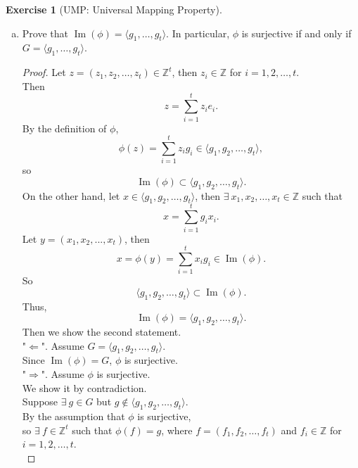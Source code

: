 \documentclass{amsart}
\newcommand{\bbz}{\mathbb{Z}}
\newcommand{\im}{\operatorname{Im}}
\theoremstyle{plain}
\theoremstyle{definition}
\newtheorem{exer}[lem]{Exercise}
\begin{document}
\begin{exer}[UMP: Universal Mapping Property]
\begin{enumerate}[(a)]
\begin{proof}
  Let $z = (z_1,z_2,\ldots,z_t) \in \bbz^t$, then $z_i \in \bbz$ for $i=1,2,\ldots,t$.\\
  Then
  \[z = \sum_{i=1}^{t}z_ie_i.\]
  Since $\phi$ and $\varphi$ are homomorphisms,
  \begin{align*} 
  	\phi (z) &=\sum_{i=1}^tz_ig_i \\
  			 &=\sum_{i=1}^tz_i\varphi(e_i) \\
  			 &=\sum_{i=1}^t\varphi(z_ie_i) \\
			 &= \varphi(z)
  \end{align*}
  Since $z \in \bbz ^t$ is arbitrary, $\phi = \varphi$.\\
  Thus, such abelian group homomorphism is unique.

\end{proof}
\item 
Prove that $\im(\phi)=\langle g_1,\ldots,g_t\rangle$.
In particular, $\phi$ is surjective if and only if $G=\langle g_1,\ldots,g_t\rangle$.
\begin{proof}
  Let $z = (z_1,z_2,\ldots,z_t) \in \bbz^t$, then $z_i \in \bbz$ for $i=1,2,\ldots,t$. \\
  Then
    \[z = \sum_{i=1}^{t}z_ie_i.\]
  By the definition of $\phi$,
  	\[ \phi (z) = \sum_{i=1}^tz_ig_i \in \langle g_1,g_2,\ldots,g_t\rangle, \]    
  	so 
  	\[ \im(\phi) \subset \langle g_1,g_2,\ldots,g_t\rangle.\]
  	On the other hand, let $x \in \langle g_1,g_2,\ldots,g_t\rangle$, then $\exists\ x_1, x_2,\ldots,x_t \in \bbz$ such that 
  	\[x = \sum_{i=1}^tg_i{x_i}.\]
	Let $y= (x_1,x_2,...,x_t)$, then 
	\[x=\phi (y) = \sum_{i=1}^{t}x_i g_i \in \im(\phi). \]
	So
	\[\langle g_1,g_2,\ldots,g_t\rangle \subset \im(\phi).\]
	Thus,
	\[ \im(\phi) = \langle g_1,g_2,\ldots,g_t\rangle.\]
	Then we show the second statement.\\
	"$\Leftarrow$". Assume $G= \langle g_1,g_2,\ldots,g_t\rangle $.\\
	Since $\im(\phi) = G$, $\phi$ is surjective.\\
	"$\Rightarrow$". Assume $\phi$ is surjective.\\
	We show it by contradiction.\\
	Suppose $\exists \ g \in G$ but $g \not\in \langle g_1,g_2,\ldots,g_t\rangle$. \\
	By the assumption that $\phi$ is surjective, \\
	so $\exists \ f \in \bbz^t$ such that $\phi(f) = g$, where $f=(f_1,f_2,\ldots,f_t)$ and $f_i \in \bbz$ for $i=1,2,\ldots,t$.\\

\end{proof}
\end{enumerate}
\end{exer}
\end{document}
